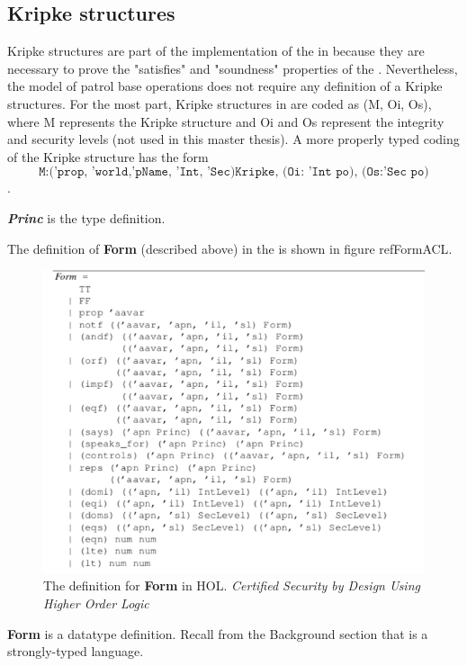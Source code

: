 \documentclass[../../main/main.tex]{subfiles}
\begin{document}
\subsection{Kripke structures}



Kripke structures are part of the implementation of the  in  because they are necessary to prove the "satisfies" and "soundness" properties of the .  Nevertheless, the model of patrol base operations does not require any definition of a Kripke structures.   For the most part, Kripke structures in  are coded as (M, Oi, Os), where M represents the Kripke structure and Oi and Os represent the integrity and security levels (not used in this master thesis).  A more properly typed coding of the Kripke structure has the form \[ \texttt{M:('prop, 'world,'pName, 'Int, 'Sec)Kripke, (Oi: 'Int po), (Os:'Sec po)} \].

\textbf{\textit{Princ}} is the type definition.  

The definition of \textbf{Form} (described above) in the  is shown in figure ref{FormACL}.

\begin{figure}[h]
\centering
\includegraphics[width=\textwidth]{../figures/FormACL}
\caption{\label{FormACL}The definition for \textbf{Form} in HOL.   \textit{Certified Security by Design Using Higher Order Logic}\cite{certmanual}}
\end{figure}

\textbf{Form} is a datatype definition.  Recall from the Background section that  is a strongly-typed language.   
\end{document}
